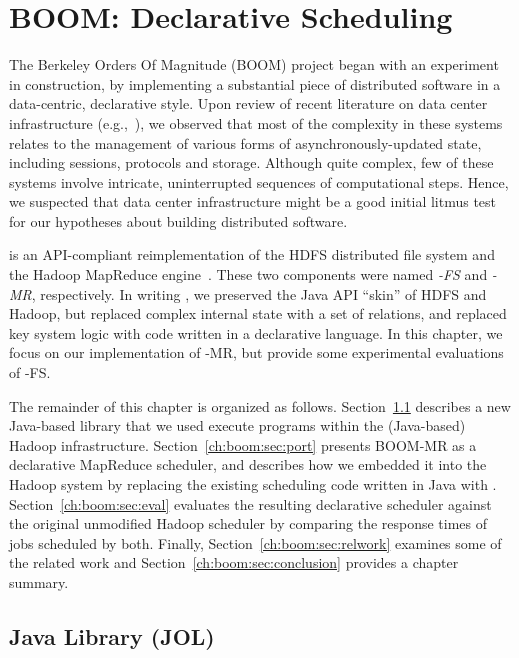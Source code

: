 \chapter[BOOM: Declarative Scheduling]{BOOM: Declarative Scheduling}
\label{ch:boom}

The Berkeley Orders Of Magnitude (BOOM) project began with an experiment in
construction, by implementing a substantial piece of distributed software in a
data-centric, declarative style.  Upon review of recent literature on
data center infrastructure (e.g.,~\cite{chubby,gfs-sosp,dynamo,mapreduce-osdi}),
we observed that most of the complexity in these systems relates to the
management of various forms of asynchronously-updated state, including
sessions, protocols and storage.  Although quite complex, few of these systems
involve intricate, uninterrupted sequences of computational steps.  Hence, we
suspected that data center infrastructure might be a good initial litmus test
for our hypotheses about building distributed software.

\emph{\BOOMA} is an API-compliant reimplementation of the HDFS distributed file
system and the Hadoop MapReduce engine~\cite{boom}.  These two components were
named \emph{\BOOM-FS} and \emph{\BOOM-MR}, respectively.  In writing \BOOMA, we
preserved the Java API ``skin'' of HDFS and Hadoop, but replaced complex
internal state with a set of relations, and replaced key system logic with code
written in a declarative language.  In this chapter, we focus on our
implementation of \BOOM-MR, but provide some experimental evaluations of
\BOOM-FS.

The remainder of this chapter is organized as follows.
Section~\ref{ch:boom:sec:jol} describes a new Java-based \OVERLOG library that
we used execute \OVERLOG programs within the (Java-based) Hadoop
infrastructure.  Section~\ref{ch:boom:sec:port} presents BOOM-MR as a
declarative MapReduce scheduler, and describes how we embedded it into the
Hadoop system by replacing the existing scheduling code written in Java with
\OVERLOG.  Section~\ref{ch:boom:sec:eval} evaluates the resulting declarative
scheduler against the original unmodified Hadoop scheduler by comparing the
response times of jobs scheduled by both.  Finally,
Section~\ref{ch:boom:sec:relwork} examines some of the related work and
Section~\ref{ch:boom:sec:conclusion} provides a chapter summary.

\section{Java \OVERLOG Library (JOL)}
\label{ch:boom:sec:jol}

